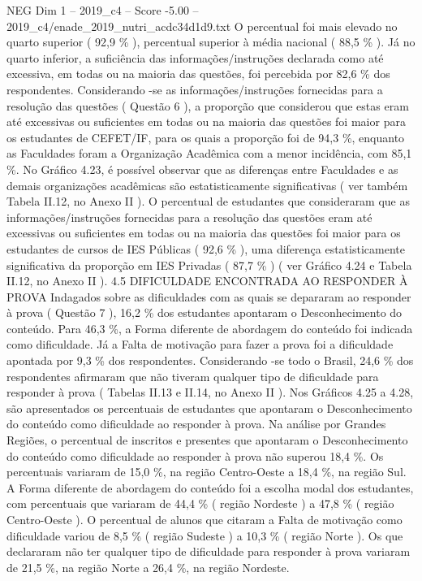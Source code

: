 \begin{textsample}{NEG Dim 1 – 2019\_c4 – Score -5.00 – 2019\_c4/enade\_2019\_nutri\_acdc34d1d9.txt}
O percentual foi mais elevado no quarto superior ( 92,9 \% ), percentual superior à média nacional ( 88,5 \% ).
Já no quarto inferior, a suficiência das informações/instruções declarada como até excessiva, em todas ou na maioria das questões, foi percebida por 82,6 \% dos respondentes.
Considerando -se as informações/instruções fornecidas para a resolução das questões ( Questão 6 ), a proporção que considerou que estas eram até excessivas ou suficientes em todas ou na maioria das questões foi maior para os estudantes de CEFET/IF, para os quais a proporção foi de 94,3 \%, enquanto as Faculdades foram a Organização Acadêmica com a menor incidência, com 85,1 \%.
No Gráfico 4.23, é possível observar que as diferenças entre Faculdades e as demais organizações acadêmicas são estatisticamente significativas ( ver também Tabela II.12, no Anexo II ).
O percentual de estudantes que consideraram que as informações/instruções fornecidas para a resolução das questões eram até excessivas ou suficientes em todas ou na maioria das questões foi maior para os estudantes de cursos de IES Públicas ( 92,6 \% ), uma diferença estatisticamente significativa da proporção em IES Privadas ( 87,7 \% ) ( ver Gráfico 4.24 e Tabela II.12, no Anexo II ). 4.5 DIFICULDADE ENCONTRADA AO RESPONDER À PROVA Indagados sobre as dificuldades com as quais se depararam ao responder à prova ( Questão 7 ), 16,2 \% dos estudantes apontaram o Desconhecimento do conteúdo.
Para 46,3 \%, a Forma diferente de abordagem do conteúdo foi indicada como dificuldade.
Já a Falta de motivação para fazer a prova foi a dificuldade apontada por 9,3 \% dos respondentes.
Considerando -se todo o Brasil, 24,6 \% dos respondentes afirmaram que não tiveram qualquer tipo de dificuldade para responder à prova ( Tabelas II.13 e II.14, no Anexo II ).
Nos Gráficos 4.25 a 4.28, são apresentados os percentuais de estudantes que apontaram o Desconhecimento do conteúdo como dificuldade ao responder à prova.
Na análise por Grandes Regiões, o percentual de inscritos e presentes que apontaram o Desconhecimento do conteúdo como dificuldade ao responder à prova não superou 18,4 \%.
Os percentuais variaram de 15,0 \%, na região Centro-Oeste a 18,4 \%, na região Sul.
A Forma diferente de abordagem do conteúdo foi a escolha modal dos estudantes, com percentuais que variaram de 44,4 \% ( região Nordeste ) a 47,8 \% ( região Centro-Oeste ).
O percentual de alunos que citaram a Falta de motivação como dificuldade variou de 8,5 \% ( região Sudeste ) a 10,3 \% ( região Norte ).
Os que declararam não ter qualquer tipo de dificuldade para responder à prova variaram de 21,5 \%, na região Norte a 26,4 \%, na região Nordeste.

\end{textsample}

